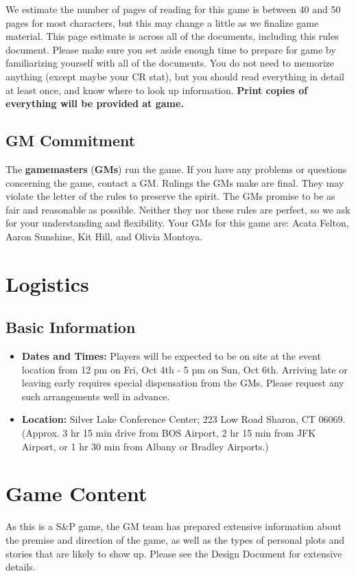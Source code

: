 \documentclass[sheet]{GL2020}
\begin{document}
We estimate the number of pages of reading for this game is between 40 and 50 pages for most characters, but this may change a little as we finalize game material. This page estimate is across all of the documents, including this rules document. Please make sure you set aside enough time to prepare for game by familiarizing yourself with all of the documents. You do not need to memorize anything (except maybe your CR stat), but you should read everything in detail at least once, and know where to look up information. \textbf{Print copies of everything will be provided at game.}

\subsection{GM Commitment}
The \textbf{gamemasters} (\textbf{GMs}) run the game. If you have any problems or questions concerning the game, contact a GM. Rulings the GMs make are final. They may violate the letter of the rules to preserve the spirit. The GMs promise to be as fair and reasonable as possible. Neither they nor these rules are perfect, so we ask for your understanding and flexibility. Your GMs for this game are: Acata Felton, Aaron Sunshine, Kit Hill, and Olivia Montoya.



\section{Logistics}
\subsection{Basic Information}
\begin{itemize}
 \item \textbf{Dates and Times:} Players will be expected to be on site at the event location from 12 pm on Fri, Oct 4th - 5 pm on Sun, Oct 6th. Arriving late or leaving early requires special dispensation from the GMs. Please request any such arrangements well in advance.
 \item \textbf{Location:} Silver Lake Conference Center; 223 Low Road Sharon, CT 06069. (Approx. 3 hr 15 min drive from BOS Airport, 2 hr 15 min from JFK Airport, or 1 hr 30 min from Albany or Bradley Airports.)
\end{itemize}

\section{Game Content}
As this is a S\&P game, the GM team has prepared extensive information about the premise and direction of the game, as well as the types of personal plots and stories that are likely to show up. Please see the Design Document for extensive details.
\end{document}
